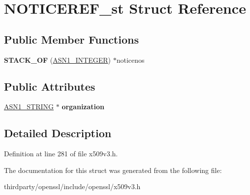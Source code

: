 \hypertarget{struct_n_o_t_i_c_e_r_e_f__st}{}\section{N\+O\+T\+I\+C\+E\+R\+E\+F\+\_\+st Struct Reference}
\label{struct_n_o_t_i_c_e_r_e_f__st}
\subsection*{Public Member Functions}
\begin{DoxyCompactItemize}
\item 
\mbox{\label{struct_n_o_t_i_c_e_r_e_f__st_a7dbc2b503b3df7f1db599d95e478205b}} 
{\bfseries S\+T\+A\+C\+K\+\_\+\+OF} (\hyperlink{structasn1__string__st}{A\+S\+N1\+\_\+\+I\+N\+T\+E\+G\+ER}) $\ast$noticenos
\end{DoxyCompactItemize}
\subsection*{Public Attributes}
\begin{DoxyCompactItemize}
\item 
\mbox{\label{struct_n_o_t_i_c_e_r_e_f__st_ada82edab12b92e7b066281582e7992cb}} 
\hyperlink{structasn1__string__st}{A\+S\+N1\+\_\+\+S\+T\+R\+I\+NG} $\ast$ {\bfseries organization}
\end{DoxyCompactItemize}


\subsection{Detailed Description}


Definition at line 281 of file x509v3.\+h.



The documentation for this struct was generated from the following file\+:\begin{DoxyCompactItemize}
\item 
thirdparty/openssl/include/openssl/x509v3.\+h\end{DoxyCompactItemize}
